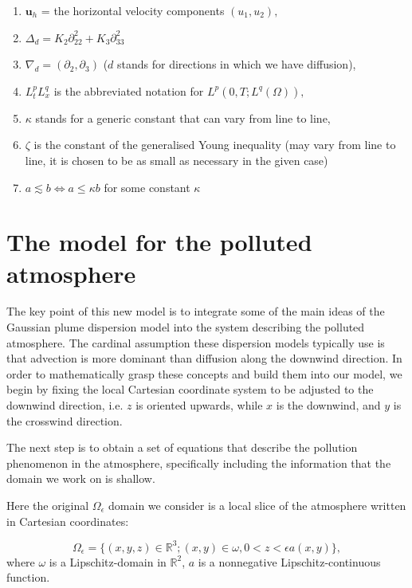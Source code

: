 \documentclass[11pt, a4paper]{article}
\begin{document}
\begin{enumerate}
\item $\mathbf{u}_h$ = the horizontal velocity components $(u_1, u_2),$
\item $\Delta_d = K_2 \partial_{22}^2 + K_3 \partial_{33}^2$
\item $\nabla_d = (\partial_2, \partial_3)$ ($d$ stands for directions in which we have diffusion),
\item $L^p_t L^q_x$ is the abbreviated notation for $L^p (0, T; L^q(\Omega)),$
\item $\kappa$ stands for a generic constant that can vary from line to line,
\item $\zeta$ is the constant of the generalised Young inequality (may vary from line to line, it is chosen to be as small as necessary in the given case)
\item $a \lesssim b \Leftrightarrow a \leq \kappa b$ for some constant $\kappa$

\end{enumerate}

\section{The model for the polluted atmosphere} \label{eqsdescribingatmpluspollution}

The key point of this new model is to integrate some of the main ideas of the Gaussian plume dispersion model into the system describing the polluted atmosphere. The cardinal assumption these dispersion models typically use is that advection is more dominant than diffusion along the downwind direction. In order to mathematically grasp these concepts and build them into our model, we begin by fixing the local Cartesian coordinate system to be adjusted to the downwind direction, i.e. $z$ is oriented upwards, while $x$ is the downwind, and $y$ is the crosswind direction.

The next step is to obtain a set of equations that describe the pollution phenomenon in the atmosphere, specifically including the information that the domain we work on is shallow.

Here the original $\Omega_\epsilon$ domain we consider is a local slice of the atmosphere written in Cartesian coordinates:

\begin{equation}\label{original_domain_eps_including}
\Omega_{\epsilon} = \{(x,y,z) \in \mathbb{R}^3 ; (x,y) \in \omega, 0 < z < \epsilon a(x,y) \},
\end{equation}
%
where $\omega$ is a Lipschitz-domain in $\mathbb{R}^2$, $a$ is a nonnegative Lipschitz-continuous function.
\end{document}
